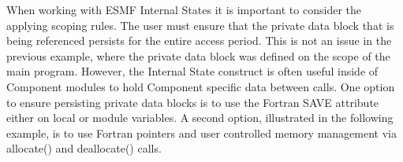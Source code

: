  
\setlength{\oldparskip}{\parskip}
\setlength{\parskip}{1.5ex}
\setlength{\oldparindent}{\parindent}
\setlength{\parindent}{0pt}
\setlength{\oldbaselineskip}{\baselineskip}
\setlength{\baselineskip}{11pt}
 
\def\bv{\begin{verbatim}}
\def\ev{\end{verbatim}}
\def\be{\begin{equation}}
\def\ee{\end{equation}}
\def\bea{\begin{eqnarray}}
\def\eea{\end{eqnarray}}
\def\bi{\begin{itemize}}
\def\ei{\end{itemize}}
\def\bn{\begin{enumerate}}
\def\en{\end{enumerate}}
\def\bd{\begin{description}}
\def\ed{\end{description}}
\def\({\left (}
\def\){\right )}
\def\[{\left [}
\def\]{\right ]}
\def\<{\left  \langle}
\def\>{\right \rangle}
\def\cI{{\cal I}}
\def\diag{\mathop{\rm diag}}
\def\tr{\mathop{\rm tr}}


 

  
     When working with ESMF Internal States it is important to consider the
     applying scoping rules. The user must ensure that the private data block
     that is being referenced persists for the entire access period. This is
     not an issue in the previous example, where the private data block was
     defined on the scope of the main program. However, the Internal State 
     construct is often useful inside of Component modules to hold Component
     specific data between calls. One option to ensure persisting private data
     blocks is to use the Fortran SAVE attribute either on local or module
     variables. A second option, illustrated in the following example, is to 
     use Fortran pointers and user controlled memory management via allocate()
     and deallocate() calls.
  
